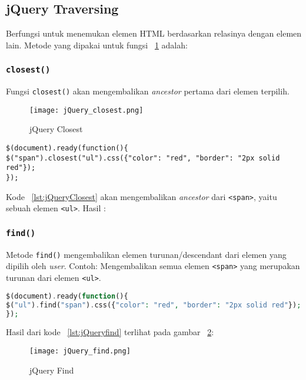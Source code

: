 \subsection{jQuery Traversing}
Berfungsi untuk menemukan elemen HTML berdasarkan relasinya dengan elemen lain. Metode yang dipakai untuk fungsi ~\ref{fig:jQueryClosest} adalah:
\subsubsection{\texttt{closest()}}
Fungsi \texttt{closest()} akan mengembalikan \textit{ancestor} pertama dari elemen terpilih.
\begin{figure} [H]
	\centering  
	\texttt{[image: jQuery\_closest.png]}  
	\caption{jQuery Closest} 
	\label{fig:jQueryClosest}
\end{figure}

\begin{lstlisting}[frame=single, language=jquery, breaklines=true, label={lst:jQueryClosest}, caption=jQuery Closest.]
$(document).ready(function(){
$("span").closest("ul").css({"color": "red", "border": "2px solid red"});
});
\end{lstlisting}

Kode ~\ref{lst:jQueryClosest} akan mengembalikan \textit{ancestor} dari \texttt{<span>}, yaitu sebuah elemen \texttt{<ul>}.
Hasil :

\subsubsection{\texttt{find()}}
Metode \texttt{find()} mengembalikan elemen turunan/descendant dari elemen yang dipilih oleh \textit{user}.
Contoh: Mengembalikan semua elemen \texttt{<span>} yang merupakan turunan dari elemen \texttt{<ul>}.


\begin{lstlisting}[frame=single,language=PHP, breaklines=true, label={lst:jQueryFind}, caption=jQuery find().]
$(document).ready(function(){
$("ul").find("span").css({"color": "red", "border": "2px solid red"});
});
\end{lstlisting}

Hasil dari kode  ~\ref{lst:jQueryfind} terlihat pada gambar ~\ref{fig:jQueryfind}: 
\begin{figure} [H]
	\centering  
	\texttt{[image: jQuery\_find.png]}  
	\caption{jQuery Find} 
	\label{fig:jQueryfind}
\end{figure}


